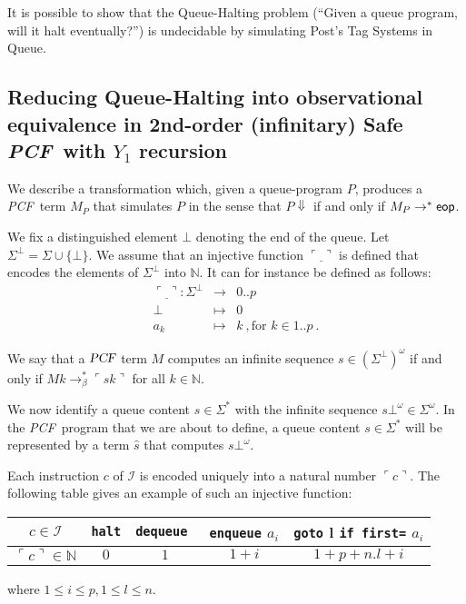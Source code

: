 \documentclass{article}
\newcommand{\encode}[1]{\ulcorner #1 \urcorner}
\newcommand{\nat}{\mathbb{N}}
\newcommand\eop{{\sf eop}}
\newcommand{\betared}{\rightarrow_\beta}
\newcommand\pcf{\textsl{PCF}}
\begin{document}
It is possible to show that the Queue-Halting problem (``Given a queue program, will it halt eventually?'') is undecidable by simulating Post's Tag Systems in Queue.

\subsection{Reducing Queue-Halting into observational equivalence in 2nd-order (infinitary) Safe \pcf\ with $Y_1$ recursion}

We describe a transformation which, given a queue-program $P$, produces a \pcf\ term $M_P$ that simulates $P$ in the sense that $P \Downarrow$ if and only if $M_P \rightarrow^* \eop$.

We fix a distinguished element $\bot$ denoting the end of the queue. Let $\Sigma^\bot = \Sigma \cup \{ \bot \}$. We assume that an injective function $\encode{\underline{\ }}$ is defined that encodes  the
elements of $\Sigma^\bot$ into $\nat$. It can for instance be defined as follows:
\begin{eqnarray*}
\encode{\underline{\ }} : \Sigma^\bot &\longrightarrow& 0..p \\
 \bot &\mapsto& 0 \\
 a_k &\mapsto& k \ , \mbox{for } k \in 1..p \ .
\end{eqnarray*}

We say that a $\pcf$ term $M$ computes an infinite sequence $s \in {(\Sigma^\bot)}^\omega$ if and only if
$M k \betared^* \encode{s k}$ for all $k\in \nat$.

We now identify a queue content $s \in \Sigma^*$ with the infinite sequence $s \bot^\omega \in \Sigma^\omega$. In the \pcf\ program that we are about to define, a queue content $s \in \Sigma^*$ will be represented by a term $\hat{s}$ that computes $s \bot^\omega$.

Each instruction $c$ of $\mathcal{I}$ is encoded uniquely into a natural number $\encode{ c }$. The following table gives an example of such an injective function:
\begin{center}
\begin{tabular}{c|c|c|c|c}
$c \in \mathcal{I}$ & {\tt halt} & {\tt dequeue } & {\tt enqueue} $a_i$ &  {\tt goto} l {\tt if first=} $a_i$ \\ \hline
$\encode{ c } \in \nat$ & $0$ & $1$ & $1+i$ & $1+p + n.l +i$ \\
\end{tabular}
\end{center}
where $1 \leq i \leq p, 1 \leq l \leq n$.
\end{document}
